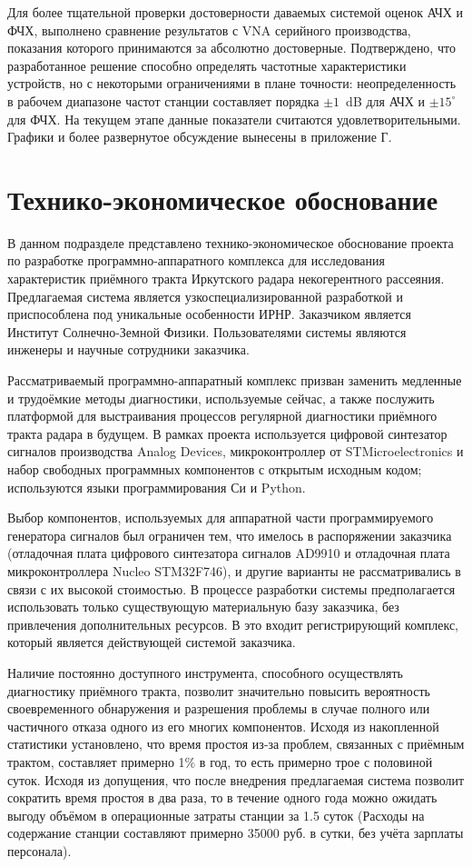 \documentclass{report}
\begin{document}
Для более тщательной проверки достоверности даваемых системой оценок АЧХ и ФЧХ, выполнено сравнение результатов с VNA серийного производства, показания которого принимаются за абсолютно достоверные. Подтверждено, что разработанное решение способно определять частотные характеристики устройств, но с некоторыми ограничениями в плане точности: неопределенность в рабочем диапазоне частот станции составляет порядка $\pm 1$~dB для АЧХ и $\pm 15^\circ$ для ФЧХ. На текущем этапе данные показатели считаются удовлетворительными. Графики и более развернутое обсуждение вынесены в приложение Г.

\section{Технико-экономическое обоснование}

В данном подразделе представлено технико-экономическое обоснование проекта по разработке программно-аппаратного комплекса для исследования характеристик приёмного тракта Иркутского радара некогерентного рассеяния. Предлагаемая система является узкоспециализированной разработкой и приспособлена под уникальные особенности ИРНР. Заказчиком является Институт Солнечно-Земной Физики. Пользователями системы являются инженеры и научные сотрудники заказчика.

Рассматриваемый программно-аппаратный комплекс призван заменить медленные и трудоёмкие методы диагностики, используемые сейчас, а также послужить платформой для выстраивания процессов регулярной диагностики приёмного тракта радара в будущем. В рамках проекта используется цифровой синтезатор сигналов производства Analog Devices, микроконтроллер от STMicroelectronics и набор свободных программных компонентов с открытым исходным кодом; используются языки программирования Си и Python.

Выбор компонентов, используемых для аппаратной части программируемого генератора сигналов был ограничен тем, что имелось в распоряжении заказчика (отладочная плата цифрового синтезатора сигналов AD9910 и отладочная плата микроконтроллера Nucleo STM32F746), и другие варианты не рассматривались в связи с их высокой стоимостью. В процессе разработки системы предполагается использовать только существующую материальную базу заказчика, без привлечения дополнительных ресурсов. В это входит регистрирующий комплекс, который является действующей системой заказчика.

Наличие постоянно доступного инструмента, способного осуществлять диагностику приёмного тракта, позволит значительно повысить вероятность своевременного обнаружения и разрешения проблемы в случае полного или частичного отказа одного из его многих компонентов. Исходя из накопленной статистики установлено, что время простоя из-за проблем, связанных с приёмным трактом, составляет примерно 1\% в год, то есть примерно трое с половиной суток. Исходя из допущения, что после внедрения предлагаемая система позволит сократить время простоя в два раза, то в течение одного года можно ожидать выгоду объёмом в операционные затраты станции за 1.5 суток (Расходы на содержание станции составляют примерно 35000 руб. в сутки, без учёта зарплаты персонала).
\end{document}
